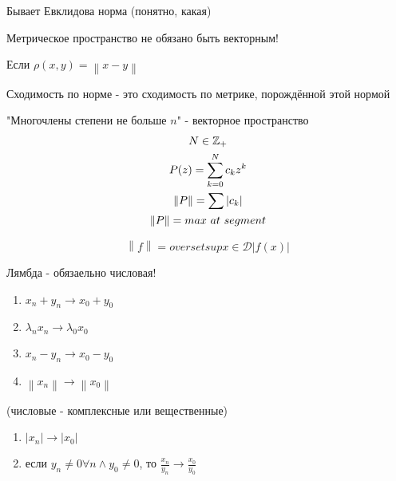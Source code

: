 \documentclass[12pt, a4paper]{article}
\begin{document}
  Бывает Евклидова норма (понятно, какая)

  \begin{note}
    Метрическое пространство не обязано быть векторным!
  \end{note}

  \begin{definition}
    Если $\rho(x, y) = \left\lVert x - y \right\rVert$
  \end{definition}

  \begin{definition}
    Сходимость по норме - это сходимость по метрике, порождённой этой нормой
  \end{definition}

  \begin{note}
    "Многочлены степени не больше $n$" - векторное пространство
    \begin{gather}
      N \in {\mathbb{Z}}_{+} \\
      P(z) = \sum_{k = 0}^N c_k z^k \\
      \left\lVert P \right\rVert = \sum |c_k| \\
      \left\lVert P \right\rVert = max ~ at ~ segment
    \end{gather}
  \end{note}

  \begin{equation}
    \left\lVert f \right\rVert = overset{sup}{x \in \mathcal{D}} |f(x)|
  \end{equation}



  \begin{theorem}
    Лямбда - обязаельно числовая!

    \begin{enumerate}
      \item $x_n + y_n \to x_0 + y_0$
      \item $\lambda_nx_n \to \lambda_0 x_0$
      \item $x_n - y_n \to x_0 - y_0$
      \item $\left\lVert x_n \right\rVert \to \left\lVert x_0 \right\rVert $
    \end{enumerate}
  \end{theorem}

  \begin{theorem}
    (числовые - комплексные или вещественные)

    \begin{enumerate}
      \item $|x_n| \to |x_0|$
      \item если $y_n \neq 0 \forall n \land y_0 \neq 0$, то $\frac{x_n}{y_n} \to \frac{x_0}{y_0}$
    \end{enumerate}
  \end{theorem}
\end{document}
